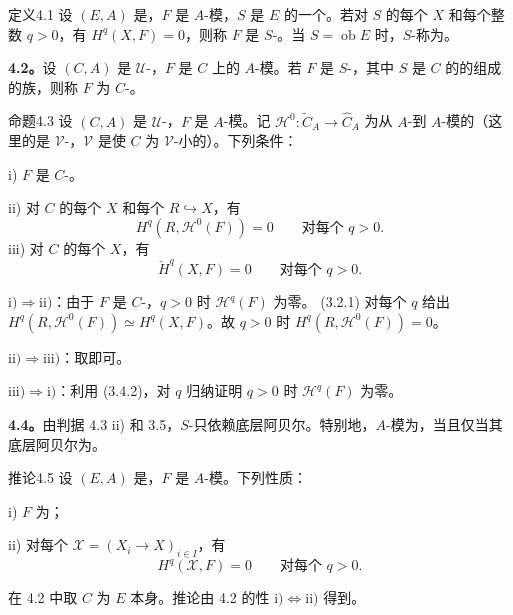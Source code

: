\begin{SGAresult}{定义}{4.1}
设 $(E,A)$ 是，$F$ 是 $A$-模，$S$ 是 $E$ 的一个。若对 $S$ 的每个 $X$ 和每个整数 $q>0$，有 $H^q(X,F)=0$，则称 $F$ 是 $S$-。当 $S=\operatorname{ob}E$ 时，$S$-称为。
\end{SGAresult}
\textbf{4.2。}设 $(C,A)$ 是 $\mathcal U$-，$F$ 是 $C$ 上的 $A$-模。若 $F$ 是 $S$-，其中 $S$ 是 $C$ 的的组成的族，则称 $F$ 为 $C$-。
\begin{SGAresult}{命题}{4.3}
设 $(C,A)$ 是 $\mathcal U$-，$F$ 是 $A$-模。记 $\mathscr H^0:\widetilde C_A\to\widehat C_A$ 为从 $A$-到 $A$-模的（这里的是 $\mathcal V$-，$\mathcal V$ 是使 $C$ 为 $\mathcal V$-小的）。下列条件：

\noindent i) $F$ 是 $C$-。

\noindent ii) 对 $C$ 的每个 $X$ 和每个 $R\hookrightarrow X$，有
\[
 H^q(R,\mathscr H^0(F))=0\qquad\text{对每个 $q>0$}.
\]
\noindent iii) 对 $C$ 的每个 $X$，有
\[
 \check H^q(X,F)=0\qquad\text{对每个 $q>0$}.
\]
\end{SGAresult}
$\mathrm{i})\Rightarrow\mathrm{ii})$：由于 $F$ 是 $C$-，$q>0$ 时 $\mathscr H^q(F)$ 为零。 (3.2.1) 对每个 $q$ 给出 $H^q(R,\mathscr H^0(F))\simeq H^q(X,F)$。故 $q>0$ 时 $H^q(R,\mathscr H^0(F))=0$。

$\mathrm{ii})\Rightarrow\mathrm{iii})$：取即可。

$\mathrm{iii})\Rightarrow\mathrm{i})$：利用 (3.4.2)，对 $q$ 归纳证明 $q>0$ 时 $\mathscr H^q(F)$ 为零。

\textbf{4.4。}由判据 4.3 ii) 和 3.5，$S$-只依赖底层阿贝尔。特别地，$A$-模为，当且仅当其底层阿贝尔为。
\begin{SGAresult}{推论}{4.5}
设 $(E,A)$ 是，$F$ 是 $A$-模。下列性质：

\noindent i) $F$ 为；

\noindent ii) 对每个 $\mathcal X=(X_i\to X)_{i\in I}$，有
\[
 H^q(\mathcal X,F)=0\qquad\text{对每个 $q>0$}.
\]
\end{SGAresult}
在 4.2 中取 $C$ 为 $E$ 本身。推论由 4.2 的性 $\mathrm{i})\Leftrightarrow\mathrm{ii})$ 得到。

